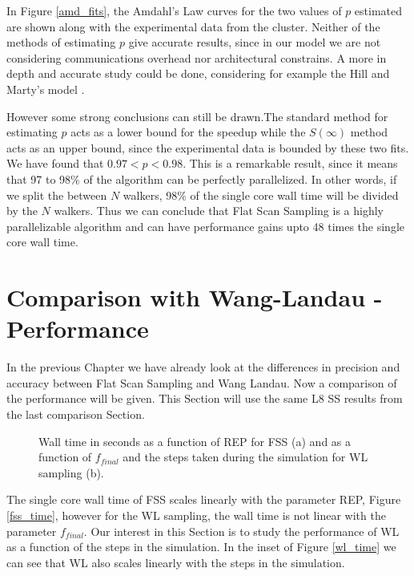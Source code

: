 	In Figure \ref{amd_fits}, the Amdahl's Law curves for the two values of $p$ estimated are shown along with the experimental data from the cluster. Neither of the methods of estimating $p$ give accurate results, since in our model we are not considering communications overhead nor architectural constrains. A more in depth and accurate study could be done, considering for example the Hill and Marty's model \cite{Hill2008}.  

	However some strong conclusions can still be drawn.The standard method for estimating $p$ acts as a lower bound for the speedup while the $S(\infty)$ method acts as an upper bound, since the experimental data is bounded by these two fits. We have found that $0.97<p<0.98$. This is a remarkable result, since it means that 97 to 98\% of the algorithm can be perfectly parallelized. In other words, if we split the between $N$ walkers, 98\% of the single core wall time will be divided by the $N$ walkers. Thus we can conclude that Flat Scan Sampling is a highly parallelizable algorithm and can have performance gains upto 48 times the single core wall time.

\section{Comparison with Wang-Landau - Performance}

	In the previous Chapter we have already look at the differences in precision and accuracy between Flat Scan Sampling and Wang Landau. Now a comparison of the performance will be given. This Section will use the same L8 SS results from the last comparison Section.
		
\begin{figure}[h]
	\centering
	\caption{Wall time in seconds as a function of REP for FSS (a) and as a function of $f_{final}$ and the steps taken during the simulation for WL sampling (b).}
\end{figure}

	The single core wall time of FSS scales linearly with the parameter REP, Figure \ref{fss_time}, however for the WL sampling, the wall time is not linear with the parameter $f_{final}$. Our interest in this Section is to study the performance of WL as a function of the steps in the simulation. In the inset of Figure \ref{wl_time} we can see that WL also scales linearly with the steps in the simulation.
	
